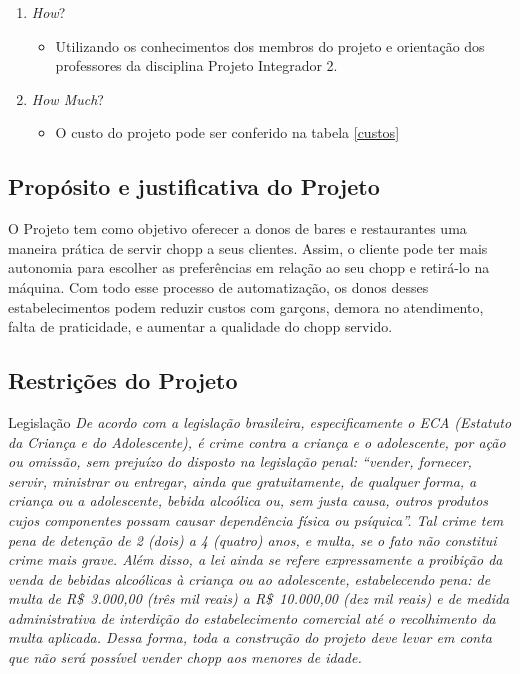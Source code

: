 			\begin{enumerate}
				\item \textit{How}?
					\begin{itemize}
						\item Utilizando os conhecimentos dos membros do projeto e orientação dos professores da disciplina Projeto Integrador 2.
					\end{itemize}
				\item \textit{How Much}?
					\begin{itemize}
						\item O custo do projeto pode ser conferido na tabela \ref{custos}
					\end{itemize}
			\end{enumerate}

		\subsection[Propósito e justificativa do Projeto]{Propósito e justificativa do Projeto}
			O Projeto tem como objetivo oferecer a donos de bares e restaurantes uma maneira prática de servir chopp a seus clientes. Assim, o cliente pode ter mais autonomia para escolher as preferências em relação ao seu chopp e retirá-lo na máquina. Com todo esse processo de automatização, os donos desses estabelecimentos podem reduzir custos com garçons, demora no atendimento, falta de praticidade, e aumentar a qualidade do chopp servido.
		
		\subsection[Restrições do Projeto]{Restrições do Projeto}
			Legislação
			\textit{De acordo com a legislação brasileira, especificamente o ECA (Estatuto da Criança e do Adolescente), é crime contra a criança e o adolescente, por ação ou omissão, sem prejuízo do disposto na legislação penal: “vender, fornecer, servir, ministrar ou entregar, ainda que gratuitamente, de qualquer forma, a criança ou a adolescente, bebida alcoólica ou, sem justa causa, outros produtos cujos componentes possam causar dependência física ou psíquica”. Tal crime tem pena de detenção de 2 (dois) a 4 (quatro) anos, e multa, se o fato não constitui crime mais grave. Além disso, a lei ainda se refere expressamente a proibição da venda de bebidas alcoólicas à criança ou ao adolescente, estabelecendo pena: de multa de R\$\ 3.000,00 (três mil reais) a R\$\ 10.000,00 (dez mil reais) e de medida administrativa de interdição do estabelecimento comercial até o recolhimento da multa aplicada. Dessa forma, toda a construção do projeto deve levar em conta que não será possível vender chopp aos menores de idade.
			}

